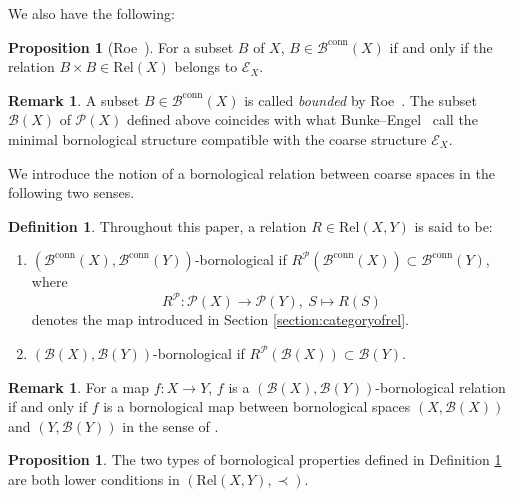\documentclass[12pt, a4paper]{amsart}
\theoremstyle{definition}
\newtheorem{proposition}[theorem]{Proposition}
\newtheorem{definition}[theorem]{Definition}
\newtheorem{remark}[theorem]{Remark}
\newcommand{\Rel}{\mathrm{Rel}}
\begin{document}
We also have the following:

\begin{proposition}[Roe~{\cite[Proposition 2.16]{Roe2003LectureCoarse}}]\label{proposition:Roebounded}
For a subset $B$ of $X$, $B \in \mathcal{B}^{\mathrm{conn}}(X)$ if and only if the relation $B \times B \in \Rel(X)$ belongs to $\mathcal{E}_X$.
\end{proposition}

\begin{remark}
A subset $B \in \mathcal{B}^{\mathrm{conn}}(X)$ is called \emph{bounded} by Roe~\cite[Proposition 2.16]{Roe2003LectureCoarse}. The subset $\mathcal{B}(X)$ of $\mathcal{P}(X)$ defined above coincides with what Bunke--Engel~\cite[Example 2.16]{BunkeEngel2020} call the minimal bornological structure compatible with the coarse structure $\mathcal{E}_X$.
\end{remark}

We introduce the notion of a bornological relation between coarse spaces in the following two senses.

\begin{definition}\label{definition:bornological}
Throughout this paper, a relation $R \in \Rel(X,Y)$ is said to be:
\begin{enumerate}
    \item $(\mathcal{B}^{\mathrm{conn}}(X),\mathcal{B}^{\mathrm{conn}}(Y))$-bornological if $R^{\mathcal{P}}(\mathcal{B}^{\mathrm{conn}}(X)) \subset \mathcal{B}^{\mathrm{conn}}(Y)$, where
    \[
    R^\mathcal{P} : \mathcal{P}(X) \rightarrow \mathcal{P}(Y), ~ S \mapsto R(S)
    \]
    denotes the map introduced in Section \ref{section:categoryofrel}.
    \item $(\mathcal{B}(X),\mathcal{B}(Y))$-bornological if $R^{\mathcal{P}}(\mathcal{B}(X)) \subset \mathcal{B}(Y)$.
\end{enumerate}
\end{definition}

\begin{remark}
For a map $f : X \rightarrow Y$, 
$f$ is a $(\mathcal{B}(X),\mathcal{B}(Y))$-bornological relation if and only if $f$ is a bornological map between bornological spaces $(X,\mathcal{B}(X))$ and $(Y,\mathcal{B}(Y))$ in the sense of \cite[Definition 2.8]{BunkeEngel2020}.
\end{remark}

\begin{proposition}\label{proposition:bornological_lower}
The two types of bornological properties defined in Definition \ref{definition:bornological} are both lower conditions in $(\Rel(X,Y),\prec)$.
\end{proposition}
\end{document}
